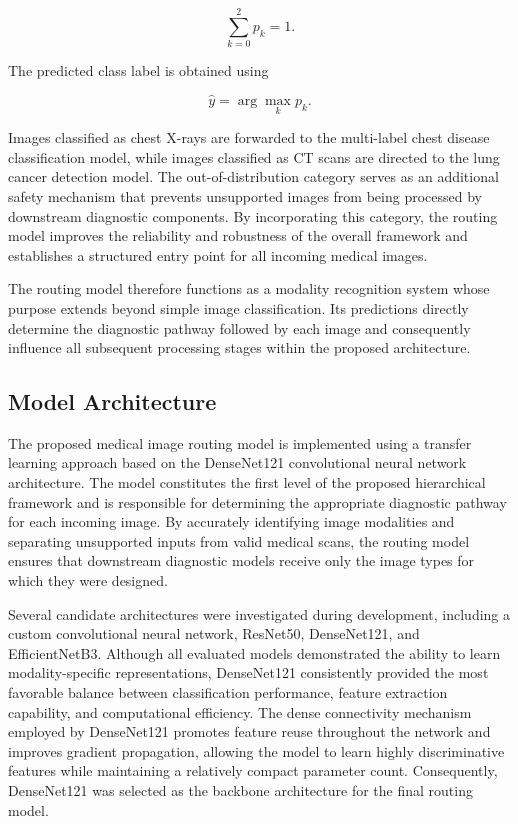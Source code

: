 \[
\sum_{k=0}^{2} p_k = 1.
\]

The predicted class label is obtained using

\[
\hat{y}=\arg\max_k p_k.
\]

Images classified as chest X-rays are forwarded to the multi-label chest disease classification model, while images classified as CT scans are directed to the lung cancer detection model. The out-of-distribution category serves as an additional safety mechanism that prevents unsupported images from being processed by downstream diagnostic components. By incorporating this category, the routing model improves the reliability and robustness of the overall framework and establishes a structured entry point for all incoming medical images.

The routing model therefore functions as a modality recognition system whose purpose extends beyond simple image classification. Its predictions directly determine the diagnostic pathway followed by each image and consequently influence all subsequent processing stages within the proposed architecture.

\subsection{Model Architecture}

The proposed medical image routing model is implemented using a transfer learning approach based on the DenseNet121 convolutional neural network architecture. The model constitutes the first level of the proposed hierarchical framework and is responsible for determining the appropriate diagnostic pathway for each incoming image. By accurately identifying image modalities and separating unsupported inputs from valid medical scans, the routing model ensures that downstream diagnostic models receive only the image types for which they were designed.

Several candidate architectures were investigated during development, including a custom convolutional neural network, ResNet50, DenseNet121, and EfficientNetB3. Although all evaluated models demonstrated the ability to learn modality-specific representations, DenseNet121 consistently provided the most favorable balance between classification performance, feature extraction capability, and computational efficiency. The dense connectivity mechanism employed by DenseNet121 promotes feature reuse throughout the network and improves gradient propagation, allowing the model to learn highly discriminative features while maintaining a relatively compact parameter count. Consequently, DenseNet121 was selected as the backbone architecture for the final routing model.

